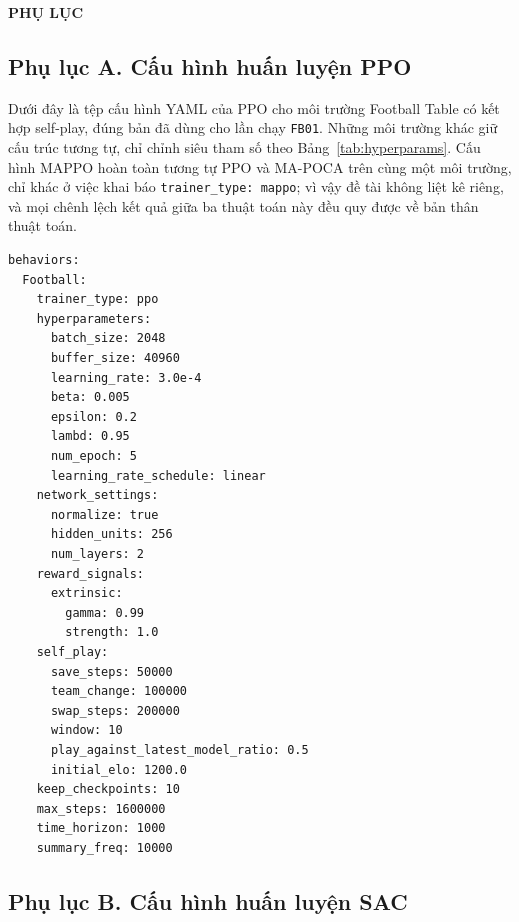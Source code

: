 \fontsize{13pt}{22.5pt}\selectfont

{}
\begin{center}
    {\large\bfseries PHỤ LỤC}
\end{center}


\subsection*{Phụ lục A. Cấu hình huấn luyện PPO}

Dưới đây là tệp cấu hình YAML của PPO cho môi trường Football Table có kết hợp self-play,
đúng bản đã dùng cho lần chạy \texttt{FB01}. Những môi trường khác giữ cấu trúc tương tự,
chỉ chỉnh siêu tham số theo Bảng~\ref{tab:hyperparams}.
Cấu hình MAPPO hoàn toàn tương tự PPO và MA-POCA trên cùng một môi trường, chỉ khác ở
việc khai báo \texttt{trainer\_type: mappo}; vì vậy đề tài không liệt kê riêng, và mọi
chênh lệch kết quả giữa ba thuật toán này đều quy được về bản thân thuật toán.

\begin{lstlisting}[basicstyle=\ttfamily\scriptsize,caption={football\_ppo.yaml},captionpos=b]
behaviors:
  Football:
    trainer_type: ppo
    hyperparameters:
      batch_size: 2048
      buffer_size: 40960
      learning_rate: 3.0e-4
      beta: 0.005
      epsilon: 0.2
      lambd: 0.95
      num_epoch: 5
      learning_rate_schedule: linear
    network_settings:
      normalize: true
      hidden_units: 256
      num_layers: 2
    reward_signals:
      extrinsic:
        gamma: 0.99
        strength: 1.0
    self_play:
      save_steps: 50000
      team_change: 100000
      swap_steps: 200000
      window: 10
      play_against_latest_model_ratio: 0.5
      initial_elo: 1200.0
    keep_checkpoints: 10
    max_steps: 1600000
    time_horizon: 1000
    summary_freq: 10000
\end{lstlisting}

\subsection*{Phụ lục B. Cấu hình huấn luyện SAC}

